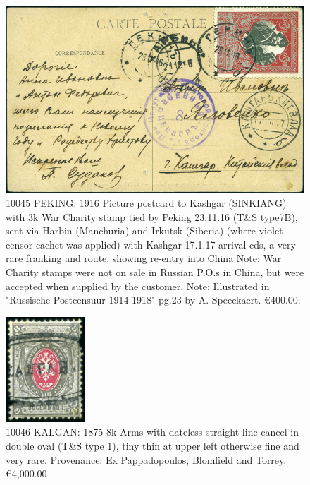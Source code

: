 \begin{figure}[htbp]
\centering
\includegraphics[width=.95\textwidth]{../russian-post-offices-in-china/10045.jpg}
\caption{
10045	PEKING: 1916 Picture postcard to Kashgar (SINKIANG) with 3k War 
Charity stamp tied by Peking 23.11.16 (T\&S type7B), sent via Harbin 
(Manchuria) and Irkutsk (Siberia) (where violet censor cachet was applied) 
with Kashgar 17.1.17 arrival cds, a very rare franking and route, showing 
re-entry into China
Note: War Charity stamps were not on sale in Russian P.O.s in China, but 
were accepted when supplied by the customer.
Note: Illustrated in "Russische Postcensuur 1914-1918" pg.23 by A. Speeckaert.
\euro 400.00. 
}  
\end{figure}   

\begin{figure}[htbp]
\centering
\includegraphics[width=.50\textwidth]{../russian-post-offices-in-china/10046.jpg}
\caption{
10046	KALGAN: 1875 8k Arms with dateless straight-line cancel in double 
oval (T\&S type 1), tiny thin at upper left otherwise fine and very rare.
Provenance: Ex Pappadopoulos, Blomfield and Torrey.
\euro 4,000.00 
}  
\end{figure}   


























                        
